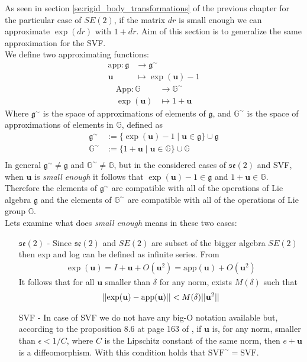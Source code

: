 \noindent
As seen in section \ref{se:rigid_body_transformations} of the previous chapter for the particular case of $SE(2)$, if the matrix $dr$ is small enough we can approximate $\exp(dr)$ with $1 + dr$. Aim of this section is to generalize the same approximation for the SVF.  \\
We define two approximating functions:
\begin{align*}
\text{app} : \mathfrak{g} & \longrightarrow  \mathfrak{g} ^{\sim}    \\
\mathbf{u} &\longmapsto \exp(\mathbf{u}) - 1
\end{align*}
\begin{align*}
\text{App} : \mathbb{G} & \longrightarrow  \mathbb{G}^{\sim}   \\
\exp(\mathbf{u}) &\longmapsto 1 + \mathbf{u}
\end{align*}
Where $\mathfrak{g} ^{\sim}$ is the space of approximations of elements of $\mathfrak{g} $, and $\mathbb{G}^{\sim} $ is the space of approximations of elements in $\mathbb{G}$, defined as
\begin{align*}
\mathfrak{g} ^{\sim} & := \{ \exp(\mathbf{u}) - 1 \mid \mathbf{u}\in \mathfrak{g}\} \cup \mathfrak{g} \\
\mathbb{G}^{\sim}  & := \{ 1 + \mathbf{u} \mid \mathbf{u}\in \mathbb{G}\} \cup \mathbb{G} \\
\end{align*}
In general $\mathfrak{g} ^{\sim} \neq \mathfrak{g}$ and $\mathbb{G}^{\sim} \neq \mathbb{G}$, but in the considered cases of $\mathfrak{se}(2)$ and SVF, when $\mathbf{u}$ is \emph{small enough}
it follows that $\exp(\mathbf{u}) - 1 \in \mathfrak{g} $ and $1 + \mathbf{u}\in\mathbb{G}$. Therefore the elements of $\mathfrak{g}^{\sim} $ are compatible with all of the operations of Lie algebra $\mathfrak{g}$ and the elements of $\mathbb{G}^{\sim}$ are compatible with all of the operations of Lie group $\mathbb{G}$.\\
Lets examine what does \emph{small enough} means in these two cases:
\begin{enumerate}
	\item[$\mathfrak{se}(2)$ -] Since $\mathfrak{se}(2)$ and $SE(2)$ are subset of the bigger algebra $SE(2)$ then exp and log can be defined as infinite series. From 
	\begin{align*}
	\exp(\mathbf{u}) = I + \mathbf{u} + O(\mathbf{u}^2) = \text{app}(\mathbf{u}) + O(\mathbf{u}^2)
	\end{align*}
	It follows that for all $\mathbf{u}$ smaller than $\delta$ for any norm, exists $M(\delta)$ such that
	\begin{align*}
	\vert\lvert \exp(\mathbf{u}) - \text{app}(\mathbf{u})  \rvert\vert < M(\delta) \vert\lvert \mathbf{u}^2 \rvert\vert
	\end{align*}
	\item[SVF -] In case of SVF we do not have any big-O notation available but, according to the proposition 8.6 at page 163 of \cite{younes2010shapes}, if $\mathbf{u}$ is, for any norm, smaller than $\epsilon<1/C$, where $C$ is the Lipschitz constant of the same norm, then $e + \mathbf{u}$ is a diffeomorphism. With this condition holds that
	$\text{SVF}^{\sim} = \text{SVF}$. 
\end{enumerate}

